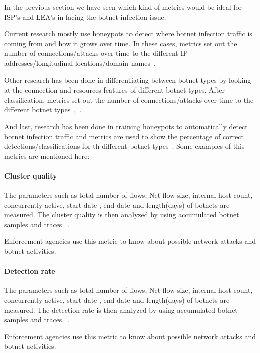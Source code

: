 In the previous section we have seen which kind of metrics would be ideal for ISP's and LEA's in facing the botnet infection issue.

Current research mostly use honeypots to detect where botnet infection traffic is coming from and how it grows over time. In these cases, metrics set out the number of connections/attacks over time to the different IP addresses/longitudinal locations/domain names~\cite{AM2006}.

Other research has been done in differentiating between botnet types by looking at the connection and resources features of different botnet types. After classification, metrics set out the number of connections/attacks over time to the different botnet types~\cite{GJ2007},~\cite{AM2005}.

And last, research has been done in training honeypots to automatically detect botnet infection traffic and metrics are used to show the percentage of correct detections/classifications for th different botnet types~\cite{haltas2014automated}.
Some examples of this metrics are mentioned here:
\paragraph{Cluster quality }

The  parameters such as total number of flows, Net flow size, internal host count, concurrently  active, start date , end date and length(days) of botnets are measured. The cluster quality is then analyzed by using accumulated botnet samples and traces ~\cite{haltas2014automated}.

Enforcement agencies use this metric to know about possible network attacks and botnet activities.


\paragraph{ Detection rate }

The  parameters such as total number of flows, Net flow size, internal host count, concurrently  active, start date , end date and length(days) of botnets are measured. The detection rate is then analyzed by using accumulated botnet samples and traces ~\cite{haltas2014automated}.

Enforcement agencies use this metric to know about possible network attacks and botnet activities.

